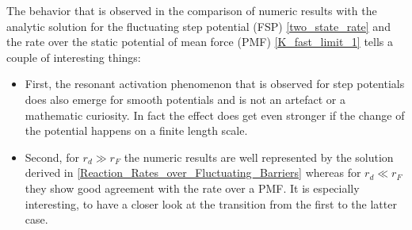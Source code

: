 The behavior that is observed in the comparison of numeric results with the analytic solution for the fluctuating step potential (FSP) \eqref{two_state_rate} and the rate over the static potential of mean force (PMF) \eqref{K_fast_limit_1} tells a couple of interesting things:
\begin{itemize}
    \item First, the resonant activation phenomenon that is observed for step potentials does also emerge for smooth potentials and is not an artefact or a mathematic curiosity. In fact the effect does get even stronger if the change of the potential happens on a finite length scale.
    \item Second, for $r_d \gg r_F$ the numeric results are well represented by the solution derived in \ref{Reaction_Rates_over_Fluctuating_Barriers} whereas for $r_d \ll r_F$ they show good agreement with the rate over a PMF. It is especially interesting, to have a closer look at the transition from the first to the latter case.
\end{itemize}
